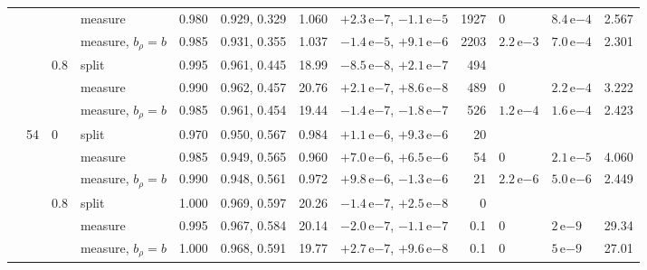 \documentclass[11pt,aps,preprint,nofootinbib,superscriptaddress,tightenlines]{revtex4-2}
\begin{document}
\begin{center}
\begin{tabular}{llll|ccc|r|r|lll}
 & & & measure & 0.980 & 0.929, 0.329 & 1.060 & $+2.3\,\mathrm e{-7}$, $-1.1\,\mathrm e{-5}$ & 1927 & 0 & $8.4\,\mathrm e{-4}$ & 2.567 \\
 & & & measure, $b_\rho=b$ & 0.985 & 0.931, 0.355 & 1.037 & $-1.4\,\mathrm e{-5}$, $+9.1\,\mathrm e{-6}$ & 2203 & $2.2\,\mathrm e{-3}$ & $7.0\,\mathrm e{-4}$ & 2.301 \\
 & & 0.8 & split & 0.995 & 0.961, 0.445 & 18.99 & $-8.5\,\mathrm e{-8}$, $+2.1\,\mathrm e{-7}$ & 494 & & & \\
 & & & measure & 0.990 & 0.962, 0.457 & 20.76 & $+2.1\,\mathrm e{-7}$, $+8.6\,\mathrm e{-8}$ & 489 & 0 & $2.2\,\mathrm e{-4}$ & 3.222 \\
 & & & measure, $b_\rho=b$ & 0.985 & 0.961, 0.454 & 19.44 & $-1.4\,\mathrm e{-7}$, $-1.8\,\mathrm e{-7}$ & 526 & $1.2\,\mathrm e{-4}$ & $1.6\,\mathrm e{-4}$ & 2.423 \\
 & 54 & 0 & split & 0.970 & 0.950, 0.567 & 0.984 & $+1.1\,\mathrm e{-6}$, $+9.3\,\mathrm e{-6}$ & 20 & & & \\
 & & & measure & 0.985 & 0.949, 0.565 & 0.960 & $+7.0\,\mathrm e{-6}$, $+6.5\,\mathrm e{-6}$ & 54 & 0 & $2.1\,\mathrm e{-5}$ & 4.060 \\
 & & & measure, $b_\rho=b$ & 0.990 & 0.948, 0.561 & 0.972 & $+9.8\,\mathrm e{-6}$, $-1.3\,\mathrm e{-6}$ & 21 & $2.2\,\mathrm e{-6}$ & $5.0\,\mathrm e{-6}$ & 2.449 \\
 & & 0.8 & split & 1.000 & 0.969, 0.597 & 20.26 & $-1.4\,\mathrm e{-7}$, $+2.5\,\mathrm e{-8}$ & 0 & & & \\
 & & & measure & 0.995 & 0.967, 0.584 & 20.14 & $-2.0\,\mathrm e{-7}$, $-1.1\,\mathrm e{-7}$ & 0.1 & 0 & $2\,\mathrm e{-9}$ & 29.34 \\
 & & & measure, $b_\rho=b$ & 1.000 & 0.968, 0.591 & 19.77 & $+2.7\,\mathrm e{-7}$, $+9.6\,\mathrm e{-8}$ & 0.1 & 0 & $5\,\mathrm e{-9}$ & 27.01 \\
\bottomrule
\end{tabular}
\end{center}
\end{document}
